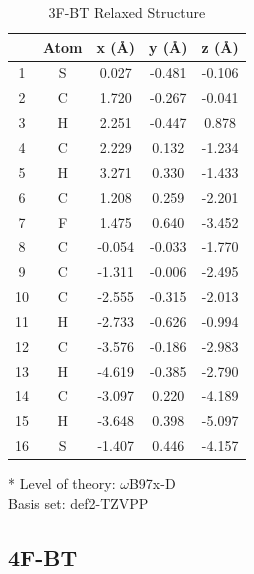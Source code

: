 \begin{table}[hbt!]\centering
\caption{3F-BT Relaxed Structure}
\renewcommand{\arraystretch}{1.5}
\begin{threeparttable}
\begin{tabular}{ccccc}\toprule
{} & {Atom} & {x (\AA)} & {y (\AA)} & {z (\AA)} \\ \midrule
   1 & S & 0.027 & -0.481 & -0.106\\
    2 & C & 1.720 & -0.267 & -0.041\\
    3 & H & 2.251 & -0.447 & 0.878\\
    4 & C & 2.229 & 0.132 & -1.234\\
    5 & H & 3.271 & 0.330 & -1.433\\
    6 & C & 1.208 & 0.259 & -2.201\\
    7 & F & 1.475 & 0.640 & -3.452\\
    8 & C & -0.054 & -0.033 & -1.770\\
    9 & C & -1.311 & -0.006 & -2.495\\
    10 & C & -2.555 & -0.315 & -2.013\\
    11 & H & -2.733 & -0.626 & -0.994\\
    12 & C & -3.576 & -0.186 & -2.983\\
    13 & H & -4.619 & -0.385 & -2.790\\
    14 & C & -3.097 & 0.220 & -4.189\\
    15 & H & -3.648 & 0.398 & -5.097\\
    16 & S & -1.407 & 0.446 & -4.157\\ \bottomrule
\end{tabular}
\begin{tablenotes}
\item[*] \footnotesize Level of theory: $\omega$B97x-D \\ Basis set: def2-TZVPP
\end{tablenotes}
\end{threeparttable}
\end{table}

\clearpage
\subsection{4F-BT}

